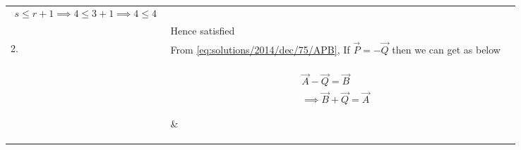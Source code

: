 \begin{longtable}{|l|l|l|}
{\begin{align}
    s\leq r+1\implies4\leq3+1\implies4\leq4
\end{align}}&\\&Hence satisfied&\\
\hline2.&From \eqref{eq:solutions/2014/dec/75/APB}, If $\vec{P}=-\vec{Q}$ then we can get as below&\\&\parbox{14cm}{\begin{align}
    \vec{A}-\vec{Q}=\vec{B}\\
    \implies\vec{B}+\vec{Q}=\vec{A}\label{eq:solutions/2014/dec/75/BQP}
\end{align}}&\\&Since matrix $\vec{Q}$ also consists only single element we can say that $rank(\vec{Q})=1$&True\\&From \eqref{eq:solutions/2014/dec/75/prop}, \eqref{eq:solutions/2014/dec/75/BQP}, we get&\\&\parbox{14cm}{\begin{align}
    rank(\vec{B}+\vec{Q})&\leq rank(\vec{B})+rank(\vec{Q})\\
    \implies rank(\vec{A})&\leq rank(\vec{B})+rank(\vec{Q})\\
    \implies r&\leq s+1\\
    \implies r-1&\leq s\label{eq:solutions/2014/dec/75/p2}
\end{align}}&\\&\textbf{Example:}&\\&Let matrix $\vec{A}$ and $\vec{B}$ are considered same as in \eqref{eq:solutions/2014/dec/75/A}, \eqref{eq:solutions/2014/dec/75/B}&\\&From \eqref{eq:solutions/2014/dec/75/ra} and \eqref{eq:solutions/2014/dec/75/rb} we got&\\&\parbox{14cm}{\begin{align}
    rank(\vec{A})=r=3\\
    rank(\vec{B})=s=4\\
\end{align}}&\\&Here matrix $\vec{Q}$ will be&\\&\parbox{14cm}{\begin{align}
    \vec{Q}&=\vec{A}-\vec{B}\\
    \implies\vec{Q}&=\myvec{0&0&0&0&0\\0&0&0&0&-8\\0&0&0&0&0\\0&0&0&0&0\\0&0&0&0&0}\implies\vec{Q}=-\vec{P}\\
    \implies rank(\vec{Q})&=1

\end{align}}
\end{longtable}
